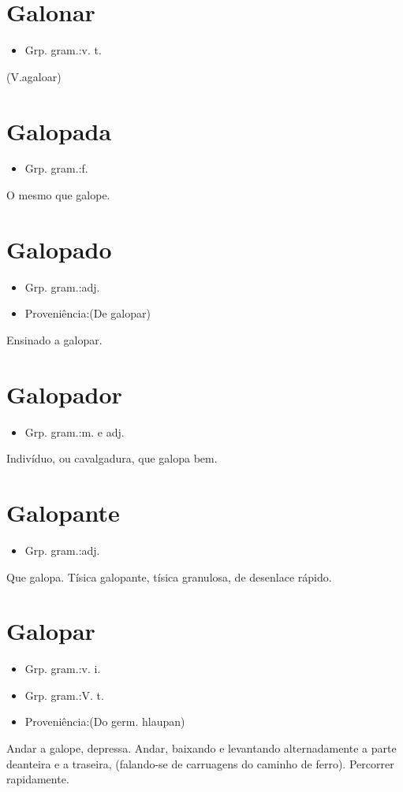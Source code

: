 \section{Galonar}
\begin{itemize}
\item {Grp. gram.:v. t.}
\end{itemize}
(V.agaloar)
\section{Galopada}
\begin{itemize}
\item {Grp. gram.:f.}
\end{itemize}
O mesmo que \textunderscore galope\textunderscore .
\section{Galopado}
\begin{itemize}
\item {Grp. gram.:adj.}
\end{itemize}
\begin{itemize}
\item {Proveniência:(De \textunderscore galopar\textunderscore )}
\end{itemize}
Ensinado a galopar.
\section{Galopador}
\begin{itemize}
\item {Grp. gram.:m.  e  adj.}
\end{itemize}
Indivíduo, ou cavalgadura, que galopa bem.
\section{Galopante}
\begin{itemize}
\item {Grp. gram.:adj.}
\end{itemize}
Que galopa.
\textunderscore Tísica galopante\textunderscore , tísica granulosa, de desenlace rápido.
\section{Galopar}
\begin{itemize}
\item {Grp. gram.:v. i.}
\end{itemize}
\begin{itemize}
\item {Grp. gram.:V. t.}
\end{itemize}
\begin{itemize}
\item {Proveniência:(Do germ. \textunderscore hlaupan\textunderscore )}
\end{itemize}
Andar a galope, depressa.
Andar, baixando e levantando alternadamente a parte deanteira e a traseira, (falando-se de carruagens do caminho de ferro).
Percorrer rapidamente.
